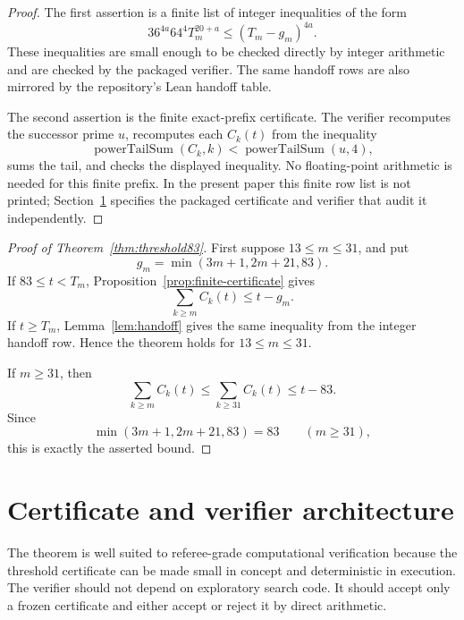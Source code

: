 \documentclass[11pt]{article}
\newcommand{\Pow}{\operatorname{powerTailSum}}
\begin{document}
\begin{proof}
The first assertion is a finite list of integer inequalities of the form
\[
  36^{4a}64^4T_m^{20+a}\le (T_m-g_m)^{4a}.
\]
These inequalities are small enough to be checked directly by integer
arithmetic and are checked by the packaged verifier.  The same handoff rows
are also mirrored by the repository's Lean handoff table.

The second assertion is the finite exact-prefix certificate.  The verifier
recomputes the successor prime \(u\), recomputes each \(C_k(t)\) from the
inequality
\[
  \Pow(C_k,k)<\Pow(u,4),
\]
sums the tail, and checks the displayed inequality.  No floating-point
arithmetic is needed for this finite prefix.  In the present paper this
finite row list is not printed; Section~\ref{sec:certificate} specifies the
packaged certificate and verifier that audit it independently.
\end{proof}

\begin{proof}[Proof of Theorem~\ref{thm:threshold83}]
First suppose \(13\le m\le31\), and put
\[
  g_m=\min(3m+1,2m+21,83).
\]
If \(83\le t<T_m\), Proposition~\ref{prop:finite-certificate} gives
\[
  \sum_{k\ge m}C_k(t)\le t-g_m.
\]
If \(t\ge T_m\), Lemma~\ref{lem:handoff} gives the same inequality from the
integer handoff row.  Hence the theorem holds for \(13\le m\le31\).

If \(m\ge31\), then
\[
  \sum_{k\ge m}C_k(t)\le \sum_{k\ge31}C_k(t)\le t-83.
\]
Since
\[
  \min(3m+1,2m+21,83)=83
  \qquad(m\ge31),
\]
this is exactly the asserted bound.
\end{proof}

\section{Certificate and verifier architecture}
\label{sec:certificate}

The theorem is well suited to referee-grade computational verification because
the threshold certificate can be made small in concept and deterministic in
execution.  The verifier should not depend on exploratory search code.  It
should accept only a frozen certificate and either accept or reject it by
direct arithmetic.
\end{document}
